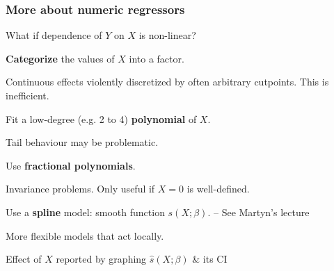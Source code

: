 \documentclass[12pt,dvipsnames,t,handout%
,aspectratio=169%
]{beamer}
\begin{document}
\begin{frame}[fragile]\frametitle{More about numeric regressors}

What if dependence of $Y$ on $X$ is non-linear?

\begin{itemize}
\item {\bf Categorize} the values of $X$ into a factor.

\bi
{\normalsize
\item[--] Continuous effects violently discretized 
  by often arbitrary cutpoints. This is inefficient.
}
\ei
\medskip
\item Fit a low-degree (e.g. 2 to 4) {\bf polynomial} of $X$.
\bi
{\normalsize
\item[--] Tail behaviour may be problematic. 
}
\ei
 \medskip
\item Use {\bf fractional polynomials}.
\bi
{\normalsize
\item[--] Invariance problems. Only useful if $X = 0$ is well-defined.
}
\ei
\medskip
\item Use a {\bf spline} model: smooth function $s(X;\beta)$. -- See Martyn's lecture
\bi
{\normalsize
\item[--] More flexible models that act locally.
\item[--] Effect of $X$ reported by graphing $\widehat s(X;\beta)$ \& its CI
}
\ei
\end{itemize}
 
\end{frame}
\end{document}
